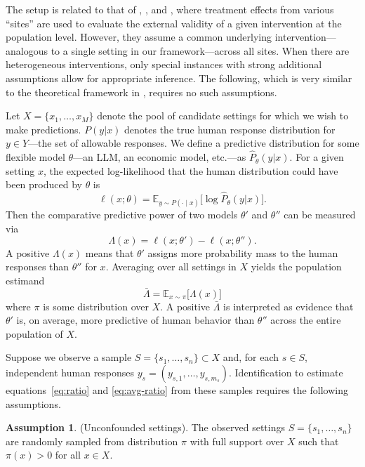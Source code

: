 \documentclass[11pt]{article}
\theoremstyle{definition}
\newtheorem{assumption}{Assumption}
\begin{document}
The setup is related to that of \cite{Hotz2005PredictingEfficacy}, \cite{Allcott2015Site}, and \cite{Dehejia2019External}, where treatment effects from various ``sites'' are used to evaluate the external validity of a given intervention at the population level.
However, they assume a common underlying intervention---analogous to a single setting in our framework---across all sites.
When there are heterogeneous interventions, only special instances with strong additional assumptions allow for appropriate inference.
The following, which is very similar to the theoretical framework in \cite{andrews2025transfer}, requires no such assumptions.

Let $X=\{x_{1},\dots,x_{M}\}$ denote the pool of candidate settings for which we wish to make predictions.
$P(y|x)$ denotes the true human response distribution for $y \in Y$---the set of allowable responses.
We define a predictive distribution for some flexible model $\theta$---an LLM, an economic model, etc.---as $\hat P_{\theta}(y|x)$.
For a given setting $x$, the expected log-likelihood that the human distribution could have been produced by $\theta$ is
\[
\ell(x;\theta) = \mathbb{E}_{y\sim P(\cdot\mid x)}\bigl[\log\hat P_{\theta}(y|x)\bigr].
\]
Then the comparative predictive power of two models $\theta'$ and $\theta''$ can be measured via
\begin{equation} \label{eq:ratio}
  \Lambda(x) = \ell(x;\theta') - \ell(x;\theta'').
\end{equation}
A positive $\Lambda(x)$ means that $\theta'$ assigns more probability mass to the human responses than $\theta''$ for $x$.
Averaging over all settings in $X$ yields the population estimand
\begin{equation} \label{eq:avg-ratio}
\bar{\Lambda} = \mathbb{E}_{x\sim\pi}\bigl[\Lambda(x)\bigr]
\end{equation}
where $\pi$ is some distribution over $X$.
A positive $\bar{\Lambda}$ is interpreted as evidence that $\theta'$ is, on average, more predictive of human behavior than $\theta''$ across the entire population of $X$.

Suppose we observe a sample $S=\{s_{1},\dots,s_{n}\}\subset X$ and, for each
$s \in S$, independent human responses $y_s=(y_{s,1},\dots,y_{s,m_s})$.
Identification to estimate equations~\ref{eq:ratio} and \ref{eq:avg-ratio} from these samples requires the following assumptions.

\begin{assumption}  \label{ass:rand-settings}
(Unconfounded settings).
The observed settings $S=\{s_{1},\dots,s_{n}\}$ are randomly sampled from distribution $\pi$ with full support over $X$ such that $\pi(x)>0$ for all $x \in X$.
\end{assumption}
\end{document}
